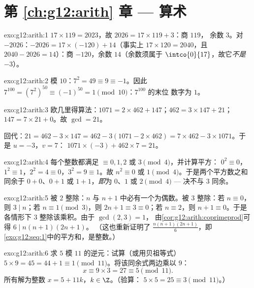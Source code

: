 \section*{第 \ref{ch:g12:arith} 章 --- 算术}

\begin{solution}{exo:g12:arith:1}
$17 \times 119 = 2023$，故 $2026 = 17 \times 119 + 3$：商 $119$，
余数 $3$。对 $-2026$：$-2026 = 17\times(-120) + 14$（事实上
$17 \times 120 = 2040$，且 $2040 - 2026 = 14$）：商 $-120$，余数
$14$（余数须属于 $\intco{0}{17}$，故它\emph{不是} $-3$）。
\end{solution}

\begin{solution}{exo:g12:arith:2}
模 $10$：$7^2 = 49 \equiv 9 \equiv -1$。因此
$7^{100} = \left(7^2\right)^{50} \equiv (-1)^{50} = 1 \pmod{10}$：$7^{100}$ 的末位
数字为 $1$。
\end{solution}

\begin{solution}{exo:g12:arith:3}
欧几里得算法：$1071 = 2\times462 + 147$；$462 = 3\times147 + 21$；
$147 = 7\times21 + 0$。故 $\gcd = 21$。

回代：$21 = 462 - 3\times147 = 462 - 3(1071 - 2\times462)
= 7\times462 - 3\times1071$。于是 $u = -3$，$v = 7$：
$1071\times(-3) + 462\times7 = 21$。
\end{solution}

\begin{solution}{exo:g12:arith:4}
每个整数都满足 $\equiv 0, 1, 2$ 或 $3 \pmod 4$，并计算平方：
$0^2 \equiv 0$，$1^2 \equiv 1$，$2^2 = 4 \equiv 0$，$3^2 = 9 \equiv 1$。故
$n^2 \equiv 0$ 或 $1 \pmod 4$。于是两个平方数之和同余于
$0 + 0$、$0 + 1$ 或 $1 + 1$，\emph{即}为 $0$、$1$ 或 $2 \pmod 4$ ---
决不与 $3$ 同余。
\end{solution}

\begin{solution}{exo:g12:arith:5}
被 $2$ 整除：$n$ 与 $n + 1$ 中必有一个为偶数。被
$3$ 整除：若 $n \equiv 0$，则 $3 \mid n$；若 $n \equiv 1 \pmod 3$，则
$2n + 1 \equiv 3 \equiv 0$；若 $n \equiv 2$，则 $n + 1 \equiv 0$。于是各情形下
$3$ 整除该乘积。由于 $\gcd(2,3) = 1$，
由\cref{cor:g12:arith:coprimeprod}可得 $6 \mid n(n+1)(2n+1)$。
（这也重新证明了 $\frac{n(n+1)(2n+1)}{6}$，即
\cref{exo:g12:seq:1}中的平方和，是整数。）
\end{solution}

\begin{solution}{exo:g12:arith:6}
求 $5$ 模 $11$ 的逆元：试算（或用贝祖等式）
$5 \times 9 = 45 = 44 + 1 \equiv 1 \pmod{11}$。将该同余式两边乘以
$9$：
\[
x \equiv 9 \times 3 = 27 \equiv 5 \pmod{11}.
\]
所有解为整数 $x = 5 + 11k$，$k \in \Z$。（验算：
$5\times5 = 25 \equiv 3 \pmod{11}$。）
\end{solution}

